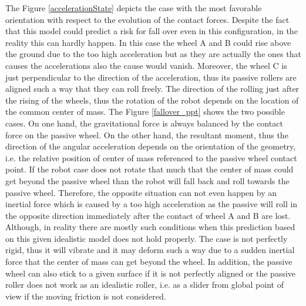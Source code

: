 \documentclass[12pt,english]{article}
\begin{document}
The Figure \ref{accelerationState} depicts the case with the most favorable orientation with respect to the evolution of the contact forces. Despite the fact that this model could predict a risk for fall over even in this configuration, in the reality this can hardly happen. In this case the wheel A and B could rise above the ground due to the too high acceleration but as they are actually the ones that causes the accelerations also the cause would vanish. Moreover, the wheel C is just perpendicular to the direction of the acceleration, thus its passive rollers are aligned such a way that they can roll freely. The direction of the rolling just after the rising of the wheels, thus the rotation of the robot depends on the location of the common center of mass. The Figure \ref{fallover_ppt} shows the two possible cases. On one hand, the gravitational force is always balanced by the contact force on the passive wheel. On the other hand, the resultant moment, thus the direction of the angular acceleration depends on the orientation of the geometry, i.e. the relative position of center of mass referenced to the passive wheel contact point. If the robot case does not rotate that much that the center of mass could get beyond the passive wheel than the robot will fall back and roll towards the passive wheel. Therefore, the opposite situation can not even happen by an inertial force which is caused by a too high acceleration as the passive will roll in the opposite direction immediately after the contact of wheel A and B are lost. Although, in reality there are mostly such conditions when this prediction based on this given idealistic model does not hold properly. The case is not perfectly rigid, thus it will vibrate and it may deform such a way due to a sudden inertial force that the center of mass can get beyond the wheel. In addition, the passive wheel can also stick to a given surface if it is not perfectly aligned or the passive roller does not work as an idealistic roller, i.e. as a slider from global point of view if the moving friction is not considered.
\end{document}
